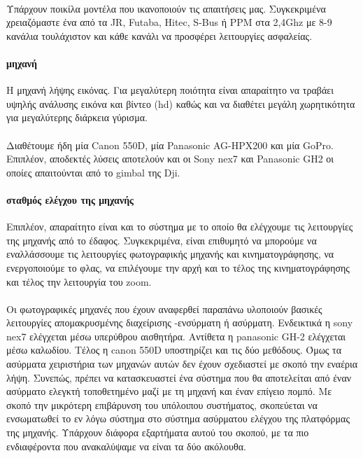 \documentclass[a4paper, 12pt, twoside]{report}
\begin{document}
{{{{{{			\paragraph{}{Υπάρχουν ποικίλα μοντέλα που ικανοποιούν τις απαιτήσεις μας. Συγκεκριμένα χρειαζόμαστε ένα από τα JR, Futaba, Hitec, S-Bus ή PPM στα 2,4Ghz με 8-9 κανάλια τουλάχιστον και κάθε κανάλι να προσφέρει λειτουργίες ασφαλείας.
			}
			
			\paragraph{μηχανή}{Η μηχανή λήψης εικόνας. Για μεγαλύτερη ποιότητα είναι απαραίτητο να τραβάει υψηλής ανάλυσης εικόνα και βίντεο (hd) καθώς και να διαθέτει μεγάλη χωρητικότητα για μεγαλύτερης διάρκεια γύρισμα.
			}
			\paragraph{}{Διαθέτουμε ήδη μία Canon 550D, μία Panasonic AG-HPX200 και μία GoPro. Επιπλέον, αποδεκτές λύσεις αποτελούν και οι Sony nex7 και Panasonic GH2 οι οποίες απαιτούνται από το gimbal της Dji.
			}
			
			\paragraph{σταθμός ελέγχου της μηχανής}{Επιπλέον, απαραίτητο είναι και το σύστημα με το οποίο θα ελέγχουμε τις λειτουργίες της μηχανής από το έδαφος. Συγκεκριμένα, είναι επιθυμητό να μπορούμε να εναλλάσσουμε τις λειτουργίες φωτογραφικής μηχανής και κινηματογράφησης, να ενεργοποιούμε το φλας, να επιλέγουμε την αρχή και το τέλος της κινηματογράφησης και τέλος την λειτουργία του zoom.
			}
			\paragraph{}{Οι φωτογραφικές μηχανές που έχουν αναφερθεί παραπάνω υλοποιούν βασικές λειτουργίες απομακρυσμένης διαχείρισης -ενσύρματη ή ασύρματη. Ενδεικτικά η sony nex7 ελέγχεται μέσω υπερύθρου αισθητήρα. Αντίθετα η panasonic GH-2 ελέγχεται μέσω καλωδίου. Τέλος η canon 550D υποστηρίζει και τις δύο μεθόδους. Όμως τα ασύρματα χειριστήρια των μηχανών αυτών δεν έχουν σχεδιαστεί με σκοπό την εναέρια λήψη. Συνεπώς, πρέπει να κατασκευαστεί ένα σύστημα που θα αποτελείται από έναν ασύρματο ελεγκτή τοποθετημένο μαζί με τη μηχανή και έναν επίγειο πομπό. Με σκοπό την μικρότερη επιβάρυνση του υπόλοιπου συστήματος, σκοπεύεται να ενσωματωθεί το εν λόγω σύστημα στο σύστημα ασύρματου ελέγχου της πλατφόρμας της μηχανής. Υπάρχουν διάφορα εξαρτήματα αυτού του σκοπού, με τα πιο ενδιαφέροντα που ανακαλύψαμε να είναι τα δύο ακόλουθα.
			}
}}}}}}
\end{document}

